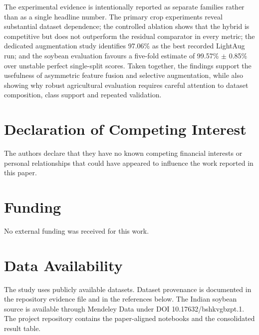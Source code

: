 \documentclass[a4paper,fleqn]{cas-dc}
\begin{document}
The experimental evidence is intentionally reported as separate families rather than as a single headline number. The primary crop experiments reveal substantial dataset dependence; the controlled ablation shows that the hybrid is competitive but does not outperform the residual comparator in every metric; the dedicated augmentation study identifies 97.06\% as the best recorded LightAug run; and the soybean evaluation favours a five-fold estimate of 99.57\% $\pm$ 0.85\% over unstable perfect single-split scores. Taken together, the findings support the usefulness of asymmetric feature fusion and selective augmentation, while also showing why robust agricultural evaluation requires careful attention to dataset composition, class support and repeated validation.

\section*{Declaration of Competing Interest}
The authors declare that they have no known competing financial interests or personal relationships that could have appeared to influence the work reported in this paper.

\section*{Funding}
No external funding was received for this work.

\section*{Data Availability}
The study uses publicly available datasets. Dataset provenance is documented in the repository evidence file and in the references below. The Indian soybean source is available through Mendeley Data under DOI 10.17632/bshkvgbzpt.1. The project repository contains the paper-aligned notebooks and the consolidated result table.
\end{document}
